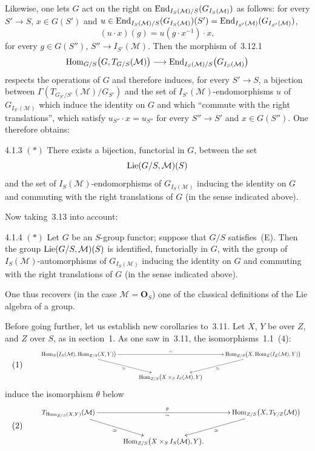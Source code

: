 Likewise, one lets \(G\) act on the right on
\(\operatorname{End}_{I_{S}(\mathcal{M})/S}(G_{I_{S}(\mathcal{M})})\) as follows: for every
\(S'\to S\), \(x\in G(S')\) and
\(u\in\operatorname{End}_{I_{S}(\mathcal{M})/S}(G_{I_{S}(\mathcal{M})})(S')
=\operatorname{End}_{I_{S'}(\mathcal{M})}(G_{I_{S'}(\mathcal{M})})\),
\[
(u\cdot x)(g)=u(g\cdot x^{-1})\cdot x,
\]
for every \(g\in G(S'')\), \(S''\to I_{S'}(\mathcal{M})\). Then the morphism
of~3.12.1
\[
\operatorname{Hom}_{G/S}\bigl(G,T_{G/S}(\mathcal{M})\bigr)
\longrightarrow
\operatorname{End}_{I_{S}(\mathcal{M})/S}\bigl(G_{I_{S}(\mathcal{M})}\bigr)
\]
respects the operations of \(G\) and therefore induces, for every \(S'\to S\),
a bijection between \(\Gamma(T_{G_{S'}/S'}(\mathcal{M})/G_{S'})\) and the set of
\(I_{S'}(\mathcal{M})\)-endomorphisms \(u\) of \(G_{I_{S'}(\mathcal{M})}\) which
induce the identity on \(G\) and which ``commute with the right
translations'', \ie which satisfy \(u_{S''}\cdot x=u_{S''}\) for every
\(S''\to S'\) and \(x\in G(S'')\). One therefore obtains:

\begin{proposition}{4.1.3}\label{II.4.1.3}
\((*)\) There exists a bijection, functorial in \(G\), between the set
\[
\operatorname{Lie}(G/S,\mathcal{M})(S)
\]
and the set of
\(I_{S}(\mathcal{M})\)-endomorphisms of \(G_{I_{S}(\mathcal{M})}\) inducing the
identity on \(G\) and commuting with the right translations of \(G\) (in the
sense indicated above).
\end{proposition}

Now taking~3.13 into account:

\begin{theorem}{4.1.4}\label{II.4.1.4}
\((*)\) Let \(G\) be an \(S\)-group functor; suppose that \(G/S\) satisfies~(E).
Then the group \(\operatorname{Lie}(G/S,\mathcal{M})(S)\) is identified, functorially in
\(G\), with the group of \(I_{S}(\mathcal{M})\)-automorphisms of
\(G_{I_{S}(\mathcal{M})}\) inducing the identity on \(G\) and commuting with
the right translations of \(G\) (in the sense indicated above).
\end{theorem}

One thus recovers (in the case \(\mathcal{M}=\mathbf{O}_{S}\)) one of the
classical definitions of the Lie algebra of a group.

\label{II.4.2.0}%
{\renewcommand{\thefootnote}{(54)}}
Before going further, let us establish new corollaries to~3.11. Let \(X\),
\(Y\) be over \(Z\), and \(Z\) over \(S\), as in section~1. As one saw
in~3.11, the isomorphisms~1.1~(4):
\[
(1)\qquad
\resizebox{0.9\linewidth}{!}{\(\vcenter{\xymatrix@C=3.5em@R=2.4em{
\Hom_{S}\bigl(I_{S}(\mathcal{M}),\Hom_{Z/S}(X,Y)\bigr)
  \ar[rr]^{\sim}
  \ar[dr]_{\simeq}
&&
\Hom_{Z/S}\bigl(X,\Hom_{Z}(I_{Z}(\mathcal{M}),Y)\bigr)
  \ar[dl]^{\simeq}
\\
&
\Hom_{Z/S}\bigl(X\times_{S}I_{S}(\mathcal{M}),Y\bigr)
}}\)}
\]
induce the isomorphism \(\theta\) below
\[
(2)\qquad
\resizebox{0.9\linewidth}{!}{\(\vcenter{\xymatrix@C=3.5em@R=2.4em{
T_{\Hom_{Z/S}(X,Y)}(\mathcal{M})
  \ar[rr]^{\theta}_{\sim}
  \ar[dr]_{\simeq}
&&
\Hom_{Z/S}\bigl(X,T_{Y/Z}(\mathcal{M})\bigr)
  \ar[dl]^{\simeq}
\\
&
\Hom_{Z/S}\bigl(X\times_{S}I_{S}(\mathcal{M}),Y\bigr)
.}}\)}
\]

